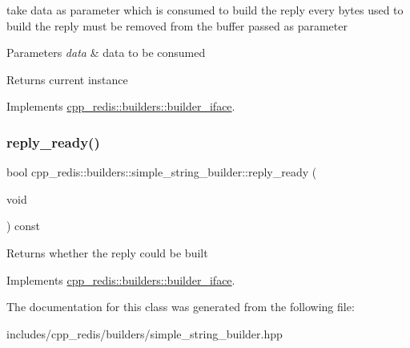 take data as parameter which is consumed to build the reply every bytes used to build the reply must be removed from the buffer passed as parameter


\begin{DoxyParams}{Parameters}
{\em data} & data to be consumed \\
\hline
\end{DoxyParams}
\begin{DoxyReturn}{Returns}
current instance 
\end{DoxyReturn}


Implements \mbox{\hyperlink{classcpp__redis_1_1builders_1_1builder__iface_a9892bbc9c887c31c2742dad4476e2fa6}{cpp\+\_\+redis\+::builders\+::builder\+\_\+iface}}.

\mbox{\label{classcpp__redis_1_1builders_1_1simple__string__builder_ad586164caf02b3022b91789cac23a72d}} 
\subsubsection{\texorpdfstring{reply\+\_\+ready()}{reply\_ready()}}
{\footnotesize\ttfamily bool cpp\+\_\+redis\+::builders\+::simple\+\_\+string\+\_\+builder\+::reply\+\_\+ready (\begin{DoxyParamCaption}\item[{void}]{ }\end{DoxyParamCaption}) const\hspace{0.3cm}{\ttfamily [virtual]}}

\begin{DoxyReturn}{Returns}
whether the reply could be built 
\end{DoxyReturn}


Implements \mbox{\hyperlink{classcpp__redis_1_1builders_1_1builder__iface_a40db9a31d4ea1771777e74146d31e12d}{cpp\+\_\+redis\+::builders\+::builder\+\_\+iface}}.



The documentation for this class was generated from the following file\+:\begin{DoxyCompactItemize}
\item 
includes/cpp\+\_\+redis/builders/simple\+\_\+string\+\_\+builder.\+hpp\end{DoxyCompactItemize}

